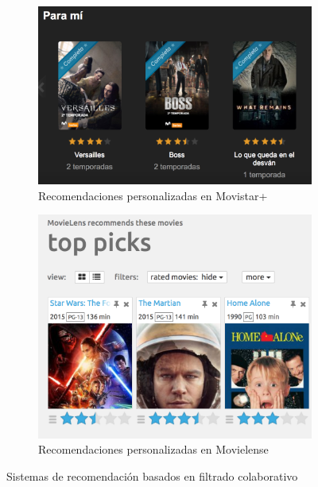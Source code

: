 \documentclass[withindex, glossary]{cam-thesis}
\begin{document}
\begin{figure}[!htbp]
    \centering
    \begin{subfigure}[t]{0.39\textwidth}
        \includegraphics[width=\textwidth]{./figures/rec-movistar.png}
        \caption{Recomendaciones personalizadas en Movistar+}\label{rec-movistar}
    \end{subfigure}
    \begin{subfigure}[t]{0.39\textwidth}
        \centering
        \includegraphics[width=\textwidth]{./figures/rec-movielense.png}
        \caption{Recomendaciones personalizadas en Movielense}\label{rec-movielense}
    \end{subfigure}
    \caption{Sistemas de recomendación basados en filtrado colaborativo}
\end{figure}
\end{document}
